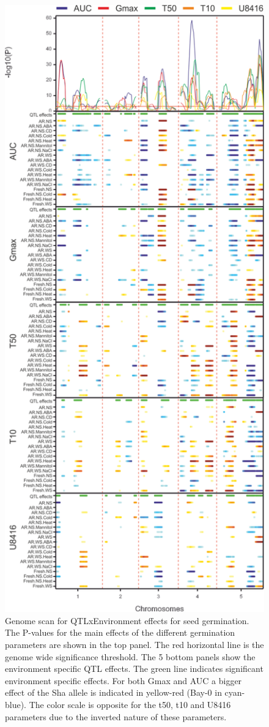 \begin{figure}[h!]
  \centering
  \includegraphics[keepaspectratio,scale=0.30]{eps/image_3_1_7.eps}
  \caption[G:E genome wide QTL scan.]{Genome scan for QTLxEnvironment effects for seed germination. The P-values for 
          the main effects of the different germination parameters are shown in the top panel. The red horizontal line 
          is the genome wide significance threshold. The 5 bottom panels show the environment specific QTL effects. 
          The green line indicates significant environment specific effects. For both Gmax and AUC a bigger effect of 
          the Sha allele is indicated in yellow-red (Bay-0 in cyan-blue). The color scale is opposite for the t50, 
          t10 and U8416 parameters due to the inverted nature of these parameters.}
          \label{fig:gegenomewide}
\end{figure}

